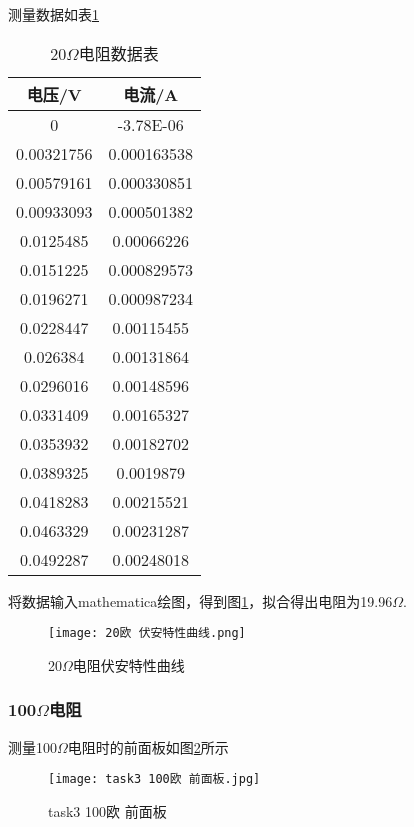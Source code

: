 \documentclass[11pt]{article}
\begin{document}
	测量数据如表\ref{tab: 20}
	\begin{table}[htbp]
		\centering
		\begin{tabular}{|c|c|}
			\hline
			电压/V      & 电流/A       \\ \hline
			0          & -3.78E-06   \\ \hline
			0.00321756 & 0.000163538 \\ \hline
			0.00579161 & 0.000330851 \\ \hline
			0.00933093 & 0.000501382 \\ \hline
			0.0125485  & 0.00066226  \\ \hline
			0.0151225  & 0.000829573 \\ \hline
			0.0196271  & 0.000987234 \\ \hline
			0.0228447  & 0.00115455  \\ \hline
			0.026384   & 0.00131864  \\ \hline
			0.0296016  & 0.00148596  \\ \hline
			0.0331409  & 0.00165327  \\ \hline
			0.0353932  & 0.00182702  \\ \hline
			0.0389325  & 0.0019879   \\ \hline
			0.0418283  & 0.00215521  \\ \hline
			0.0463329  & 0.00231287  \\ \hline
			0.0492287  & 0.00248018  \\ \hline
		\end{tabular}
		\caption{20$\Omega$电阻数据表}
		\label{tab: 20}
	\end{table}
	
	将数据输入mathematica绘图，得到图\ref{fig:20欧 伏安特性曲线}，拟合得出电阻为19.96$\Omega$.
	
	\begin{figure}[h!]
		\centering
		\texttt{[image: 20欧 伏安特性曲线.png]}
		\caption{20$\Omega$电阻伏安特性曲线}
		\label{fig:20欧 伏安特性曲线}
	\end{figure}
	
	\subsubsection{100$\Omega$电阻}
	测量100$\Omega$电阻时的前面板如图\ref{fig:task3 100欧 前面板}所示
	
	\begin{figure}[h!]
		\centering
		\texttt{[image: task3 100欧 前面板.jpg]}
		\caption{task3 100欧 前面板}
		\label{fig:task3 100欧 前面板}
	\end{figure}
	
\end{document}
